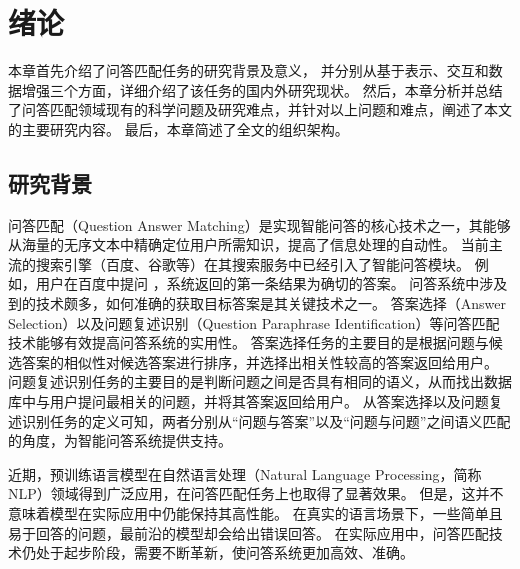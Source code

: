 \chapter{绪论}

本章首先介绍了问答匹配任务的研究背景及意义，
并分别从基于表示、交互和数据增强三个方面，详细介绍了该任务的国内外研究现状。
然后，本章分析并总结了问答匹配领域现有的科学问题及研究难点，并针对以上问题和难点，阐述了本文的主要研究内容。
最后，本章简述了全文的组织架构。

\section{研究背景}


问答匹配（Question Answer Matching）是实现智能问答的核心技术之一，其能够从海量的无序文本中精确定位用户所需知识，提高了信息处理的自动性。
当前主流的搜索引擎（百度、谷歌等）在其搜索服务中已经引入了智能问答模块。
例如，用户在百度中提问{} ，系统返回的第一条结果为确切的答案{}。
问答系统中涉及到的技术颇多，如何准确的获取目标答案是其关键技术之一。
答案选择（Answer Selection）以及问题复述识别（Question Paraphrase Identification）等问答匹配技术能够有效提高问答系统的实用性。
答案选择任务的主要目的是根据问题与候选答案的相似性对候选答案进行排序，并选择出相关性较高的答案返回给用户。
问题复述识别任务的主要目的是判断问题之间是否具有相同的语义，从而找出数据库中与用户提问最相关的问题，并将其答案返回给用户。
从答案选择以及问题复述识别任务的定义可知，两者分别从“问题与答案”以及“问题与问题”之间语义匹配的角度，为智能问答系统提供支持。

近期，预训练语言模型在自然语言处理（Natural Language Processing，简称NLP）领域得到广泛应用，在问答匹配任务上也取得了显著效果。
但是，这并不意味着模型在实际应用中仍能保持其高性能。
在真实的语言场景下，一些简单且易于回答的问题，最前沿的模型却会给出错误回答。
在实际应用中，问答匹配技术仍处于起步阶段，需要不断革新，使问答系统更加高效、准确。

